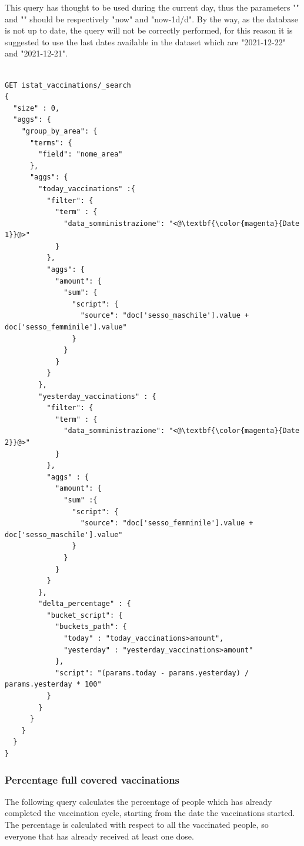 \documentclass{article}
\begin{document}
This query has thought to be used during the current day, thus the parameters "{\color{magenta}{Date 1}}" and "{\color{magenta}{Date 2}}" should be respectively "now" and "now-1d/d". By the way, as the database is not up to date, the query will not be correctly performed, for this reason it is suggested to use the last dates available in the dataset which are "2021-12-22" and "2021-12-21".

\begin{lstlisting}[language=cypher, label=lst:cypher-example]

GET istat_vaccinations/_search
{
  "size" : 0,
  "aggs": {
    "group_by_area": {
      "terms": {
        "field": "nome_area"
      },
      "aggs": {
        "today_vaccinations" :{
          "filter": {
            "term" : {
              "data_somministrazione": "<@\textbf{\color{magenta}{Date 1}}@>"
            }
          },
          "aggs": {
            "amount": {
              "sum": {
                "script": {
                  "source": "doc['sesso_maschile'].value + doc['sesso_femminile'].value"
                }
              }
            }
          }
        },
        "yesterday_vaccinations" : {
          "filter": {
            "term" : {
              "data_somministrazione": "<@\textbf{\color{magenta}{Date 2}}@>"
            }
          },
          "aggs" : {
            "amount": {
              "sum" :{
                "script": {
                  "source": "doc['sesso_femminile'].value + doc['sesso_maschile'].value"
                }
              }
            }
          }
        },
        "delta_percentage" : {
          "bucket_script": {
            "buckets_path": {
              "today" : "today_vaccinations>amount",
              "yesterday" : "yesterday_vaccinations>amount"
            },
            "script": "(params.today - params.yesterday) / params.yesterday * 100"
          }
        }
      }
    }
  }
}

\end{lstlisting}
\newpage
\subsubsection{Percentage full covered vaccinations}
The following query calculates the percentage of people which has already completed the vaccination cycle, starting from the date the vaccinations started. The percentage is calculated with respect to all the vaccinated people, so everyone that has already received at least one dose.
\end{document}
